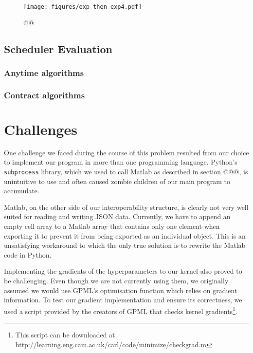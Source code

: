 \documentclass[a4paper,12pt,twoside,openright]{report}
\begin{document}
\begin{figure}
\centering
  \texttt{[image: figures/exp\_then\_exp4.pdf]}
  \caption{@@}
  \label{sched:exp_then_exp4}
\end{figure}

\subsection{Scheduler Evaluation}

\subsubsection{Anytime algorithms}

\subsubsection{Contract algorithms}





\section{Challenges}
One challenge we faced during the course of this problem resulted from our choice to implement our program in more than one programming language. Python's \texttt{subprocess} library, which we used to call Matlab as described in section @@@, is unintuitive to use and often caused zombie children of our main program to accumulate. 

Matlab, on the other side of our interoperability structure, is clearly not very well suited for reading and writing JSON data. Currently, we have to append an empty cell array to a Matlab array that contains only one element when exporting it to prevent it from being exported as an individual object. This is an unsatisfying workaround to which the only true solution is to rewrite the Matlab code in Python.

Implementing the gradients of the hyperparameters to our kernel also proved to be challenging. Even though we are not currently using them, we originally assumed we would use GPML's optimisation function which relies on gradient information. To test our gradient implementation and ensure its correctness, we used a script provided by the creators of GPML that checks kernel gradients\footnote{This script can be downloaded at http://learning.eng.cam.ac.uk/carl/code/minimize/checkgrad.m}. %
\end{document}
